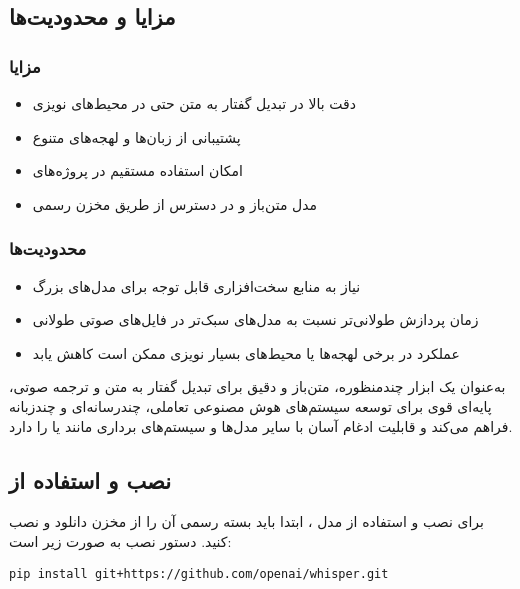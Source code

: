 \documentclass{article}
\begin{document}
\subsection{مزایا و محدودیت‌ها}
\subsubsection{مزایا}
\begin{itemize}
\item دقت بالا در تبدیل گفتار به متن حتی در محیط‌های نویزی
\item پشتیبانی از زبان‌ها و لهجه‌های متنوع
\item امکان استفاده مستقیم در پروژه‌های 
\item مدل متن‌باز و در دسترس از طریق مخزن رسمی 
\end{itemize}

\subsubsection{محدودیت‌ها}
\begin{itemize}
\item نیاز به منابع سخت‌افزاری قابل توجه برای  مدل‌های بزرگ
\item زمان پردازش طولانی‌تر نسبت به مدل‌های سبک‌تر در 
فایل‌های صوتی طولانی
\item عملکرد در برخی لهجه‌ها یا محیط‌های بسیار نویزی ممکن است کاهش یابد
\end{itemize}

 به‌عنوان یک ابزار چندمنظوره، متن‌باز و دقیق برای تبدیل گفتار به متن و ترجمه صوتی، پایه‌ای قوی برای توسعه سیستم‌های هوش مصنوعی تعاملی، چندرسانه‌ای و چندزبانه فراهم می‌کند و قابلیت ادغام آسان با سایر مدل‌ها و سیستم‌های برداری مانند  یا  را دارد.

\subsection{نصب و استفاده از }
برای نصب و استفاده از مدل ، ابتدا باید بسته رسمی آن را از مخزن  دانلود و نصب کنید.
دستور نصب به صورت زیر است:

\begin{latin}
\begin{lstlisting}
pip install git+https://github.com/openai/whisper.git
\end{lstlisting}
\end{latin}
\end{document}
